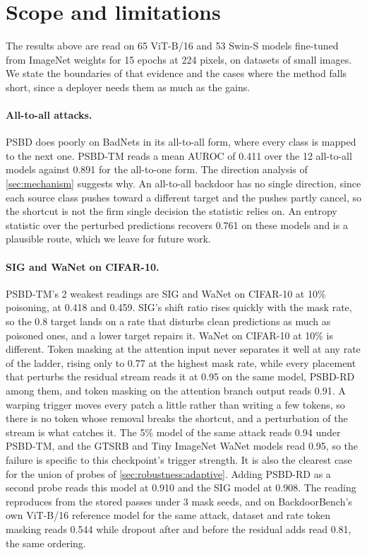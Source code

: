 \section{Scope and limitations}
\label{sec:limitations}

The results above are read on 65 ViT-B/16 and 53 Swin-S models fine-tuned from ImageNet weights for 15 epochs at 224 pixels, on datasets of small images. We state the boundaries of that evidence and the cases where the method falls short, since a deployer needs them as much as the gains.

\paragraph{All-to-all attacks.}
PSBD does poorly on BadNets in its all-to-all form, where every class is mapped to the next one. PSBD-TM reads a mean AUROC of 0.411 over the 12 all-to-all models against 0.891 for the all-to-one form. The direction analysis of \cref{sec:mechanism} suggests why. An all-to-all backdoor has no single direction, since each source class pushes toward a different target and the pushes partly cancel, so the shortcut is not the firm single decision the statistic relies on. An entropy statistic over the perturbed predictions recovers 0.761 on these models and is a plausible route, which we leave for future work.

\paragraph{SIG and WaNet on CIFAR-10.}
PSBD-TM's 2 weakest readings are SIG and WaNet on CIFAR-10 at 10\% poisoning, at 0.418 and 0.459. SIG's shift ratio rises quickly with the mask rate, so the 0.8 target lands on a rate that disturbs clean predictions as much as poisoned ones, and a lower target repairs it. WaNet on CIFAR-10 at 10\% is different. Token masking at the attention input never separates it well at any rate of the ladder, rising only to 0.77 at the highest mask rate, while every placement that perturbs the residual stream reads it at 0.95 on the same model, PSBD-RD among them, and token masking on the attention branch output reads 0.91. A warping trigger moves every patch a little rather than writing a few tokens, so there is no token whose removal breaks the shortcut, and a perturbation of the stream is what catches it. The 5\% model of the same attack reads 0.94 under PSBD-TM, and the GTSRB and Tiny ImageNet WaNet models read 0.95, so the failure is specific to this checkpoint's trigger strength. It is also the clearest case for the union of probes of \cref{sec:robustness:adaptive}. Adding PSBD-RD as a second probe reads this model at 0.910 and the SIG model at 0.908. The reading reproduces from the stored passes under 3 mask seeds, and on BackdoorBench's own ViT-B/16 reference model for the same attack, dataset and rate token masking reads 0.544 while dropout after and before the residual adds read 0.81, the same ordering.

